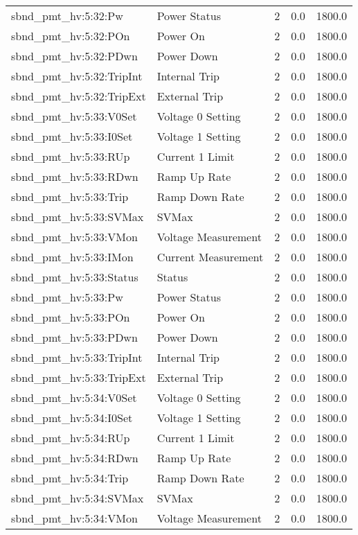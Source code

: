 \begin{center}
\begin{longtable}{l | l l l l }
sbnd\_pmt\_hv:5:32:Pw & Power Status & 2 & 0.0 & 1800.0\\ 
sbnd\_pmt\_hv:5:32:POn & Power On & 2 & 0.0 & 1800.0\\ 
sbnd\_pmt\_hv:5:32:PDwn & Power Down & 2 & 0.0 & 1800.0\\ 
sbnd\_pmt\_hv:5:32:TripInt & Internal Trip & 2 & 0.0 & 1800.0\\ 
sbnd\_pmt\_hv:5:32:TripExt & External Trip & 2 & 0.0 & 1800.0\\ 
sbnd\_pmt\_hv:5:33:V0Set & Voltage 0 Setting & 2 & 0.0 & 1800.0\\ 
sbnd\_pmt\_hv:5:33:I0Set & Voltage 1 Setting & 2 & 0.0 & 1800.0\\ 
sbnd\_pmt\_hv:5:33:RUp & Current 1 Limit & 2 & 0.0 & 1800.0\\ 
sbnd\_pmt\_hv:5:33:RDwn & Ramp Up Rate & 2 & 0.0 & 1800.0\\ 
sbnd\_pmt\_hv:5:33:Trip & Ramp Down Rate & 2 & 0.0 & 1800.0\\ 
sbnd\_pmt\_hv:5:33:SVMax & SVMax & 2 & 0.0 & 1800.0\\ 
sbnd\_pmt\_hv:5:33:VMon & Voltage Measurement & 2 & 0.0 & 1800.0\\ 
sbnd\_pmt\_hv:5:33:IMon & Current Measurement & 2 & 0.0 & 1800.0\\ 
sbnd\_pmt\_hv:5:33:Status & Status & 2 & 0.0 & 1800.0\\ 
sbnd\_pmt\_hv:5:33:Pw & Power Status & 2 & 0.0 & 1800.0\\ 
sbnd\_pmt\_hv:5:33:POn & Power On & 2 & 0.0 & 1800.0\\ 
sbnd\_pmt\_hv:5:33:PDwn & Power Down & 2 & 0.0 & 1800.0\\ 
sbnd\_pmt\_hv:5:33:TripInt & Internal Trip & 2 & 0.0 & 1800.0\\ 
sbnd\_pmt\_hv:5:33:TripExt & External Trip & 2 & 0.0 & 1800.0\\ 
sbnd\_pmt\_hv:5:34:V0Set & Voltage 0 Setting & 2 & 0.0 & 1800.0\\ 
sbnd\_pmt\_hv:5:34:I0Set & Voltage 1 Setting & 2 & 0.0 & 1800.0\\ 
sbnd\_pmt\_hv:5:34:RUp & Current 1 Limit & 2 & 0.0 & 1800.0\\ 
sbnd\_pmt\_hv:5:34:RDwn & Ramp Up Rate & 2 & 0.0 & 1800.0\\ 
sbnd\_pmt\_hv:5:34:Trip & Ramp Down Rate & 2 & 0.0 & 1800.0\\ 
sbnd\_pmt\_hv:5:34:SVMax & SVMax & 2 & 0.0 & 1800.0\\ 
sbnd\_pmt\_hv:5:34:VMon & Voltage Measurement & 2 & 0.0 & 1800.0\\ 

\end{longtable}
\end{center}
